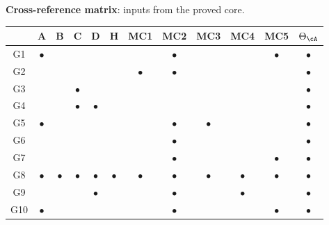 \medskip

\noindent\textbf{Cross-reference matrix}: inputs from the proved core.

\begin{center}
\renewcommand{\arraystretch}{1.3}
\small
\begin{tabular}{c|ccccc|ccccc|c}
& \textbf{A} & \textbf{B} & \textbf{C} & \textbf{D} & \textbf{H}
& \textbf{MC1} & \textbf{MC2} & \textbf{MC3} & \textbf{MC4} & \textbf{MC5}
& $\Theta_\cA$ \\
\hline
G1 & $\bullet$ & & & & & & $\bullet$ & & & $\bullet$ & $\bullet$ \\
G2 & & & & & & $\bullet$ & $\bullet$ & & & & $\bullet$ \\
G3 & & & $\bullet$ & & & & & & & & $\bullet$ \\
G4 & & & $\bullet$ & $\bullet$ & & & & & & & $\bullet$ \\
G5 & $\bullet$ & & & & & & $\bullet$ & $\bullet$ & & & $\bullet$ \\
G6 & & & & & & & $\bullet$ & & & & $\bullet$ \\
G7 & & & & & & & $\bullet$ & & & $\bullet$ & $\bullet$ \\
G8 & $\bullet$ & $\bullet$ & $\bullet$ & $\bullet$ & $\bullet$
 & $\bullet$ & $\bullet$ & $\bullet$ & $\bullet$ & $\bullet$
 & $\bullet$ \\
G9 & & & & $\bullet$ & & & $\bullet$ & & $\bullet$ & & $\bullet$ \\
G10 & $\bullet$ & & & & & & $\bullet$ & & & $\bullet$ & $\bullet$
\end{tabular}
\end{center}
